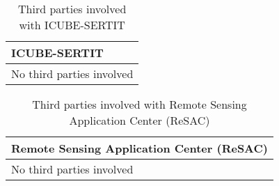 \begin{table}[H]
	\centering
	\begin{tabular}{|p{10cm}|p{4cm}|}
		\hline
		
		\multicolumn{2}{|p{14cm}|}{\textbf{ICUBE-SERTIT}}\\
		
		\hline
		
		\multicolumn{2}{|p{14cm}|}{No third parties involved}\\
		
		\hline
		
	\end{tabular}
	\caption{Third parties involved with ICUBE-SERTIT}
\end{table}



\begin{table}[H]
	\centering
	\begin{tabular}{|p{10cm}|p{4cm}|}
		\hline
		
		\multicolumn{2}{|p{14cm}|}{\textbf{Remote Sensing Application Center (ReSAC)}}\\
		
		\hline
		
		\multicolumn{2}{|p{14cm}|}{No third parties involved}\\
		
		\hline
	\end{tabular}
	\caption{Third parties involved with Remote Sensing Application Center (ReSAC)}
\end{table}



